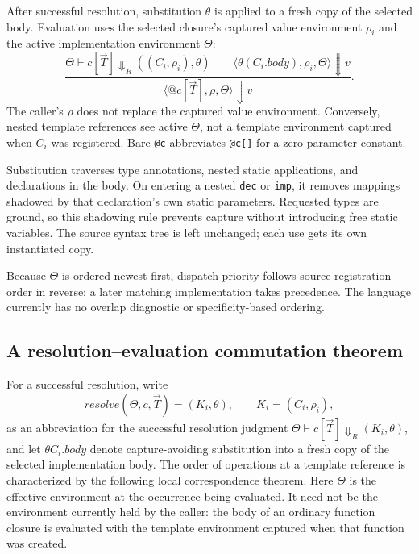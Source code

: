 \documentclass[11pt]{article}
\begin{document}
After successful resolution, substitution \(\theta\) is applied to a fresh
copy of the selected body. Evaluation uses the selected closure's captured
value environment \(\rho_i\) and the active implementation environment
\(\Theta\):
\[
\frac{\Theta\vdash c[\vec T]\Downarrow_R((C_i,\rho_i),\theta)
      \qquad
      \langle\theta(C_i.\mathit{body}),\rho_i,\Theta\rangle\Downarrow v}
     {\langle\texttt{@}c[\vec T],\rho,\Theta\rangle\Downarrow v}.
\]
The caller's \(\rho\) does not replace the captured value environment.
Conversely, nested template references see active \(\Theta\), not a template
environment captured when \(C_i\) was registered. Bare \texttt{@c}
abbreviates \texttt{@c[]} for a zero-parameter constant.

Substitution traverses type annotations, nested static applications, and
declarations in the body. On entering a nested \texttt{dec} or \texttt{imp},
it removes mappings shadowed by that declaration's own static parameters.
Requested types are ground, so this shadowing rule prevents capture without
introducing free static variables. The source syntax tree is left unchanged;
each use gets its own instantiated copy.

Because \(\Theta\) is ordered newest first, dispatch priority follows source
registration order in reverse: a later matching implementation takes
precedence. The language currently has no overlap diagnostic or
specificity-based ordering.

\subsection{A resolution--evaluation commutation theorem}

For a successful resolution, write
\[
  \mathit{resolve}(\Theta,c,\vec T)=(K_i,\theta),
  \qquad K_i=(C_i,\rho_i),
\]
as an abbreviation for the successful resolution judgment
\(\Theta\vdash c[\vec T]\Downarrow_R(K_i,\theta)\),
and let \(\theta C_i.\mathit{body}\) denote capture-avoiding substitution
into a fresh copy of the selected implementation body. The order of
operations at a template reference is characterized by the following
local correspondence theorem. Here \(\Theta\) is the effective environment
at the occurrence being evaluated. It need not be the environment currently
held by the caller: the body of an ordinary function closure is evaluated
with the template environment captured when that function was created.
\end{document}
